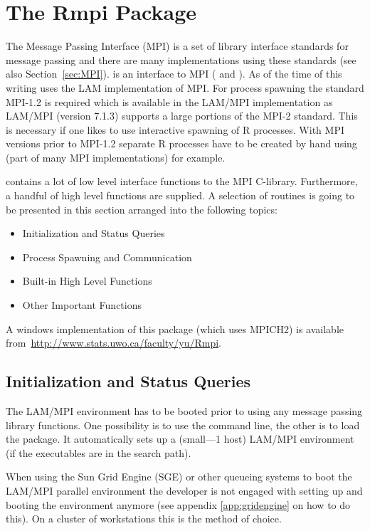 \section{The Rmpi Package}
\label{sec:Rmpi}
The Message Passing Interface (MPI) is a set of library interface
standards for message passing and there are many implementations using
these standards (see also Section~\ref{sec:MPI}).
 is an interface to MPI (\cite{yu02Rmpi} and
\cite{yu06Rmpi}). As 
of the time of this writing  uses
the LAM implementation of MPI. For process spawning the standard
MPI-1.2 is required which is available in the LAM/MPI implementation 
as LAM/MPI (version 7.1.3) supports a large portions of the MPI-2
standard. This is necessary if one likes to use interactive spawning
of R processes. With MPI versions prior to MPI-1.2 separate R
processes have to be created by hand using  (part of many
MPI implementations) for example.

 contains a lot of low level interface functions to the MPI
C-library. 
Furthermore, a handful of high level functions are supplied. A
selection of routines is going to be presented in this section arranged
into the following topics:

\begin{itemize}
\item Initialization and Status Queries
\item Process Spawning and Communication
\item Built-in High Level Functions
\item Other Important Functions
\end{itemize}  

A windows implementation of this package (which uses MPICH2)
is available from~\url{http://www.stats.uwo.ca/faculty/yu/Rmpi}.

\subsection{Initialization and Status Queries}

The LAM/MPI environment has to be booted prior to using any
message passing library functions. One possibility is to use the
command line, the other is to load the  package. It automatically
sets up a (small---1 host) LAM/MPI environment (if the executables are
in the search path). 

When using the Sun Grid Engine (SGE) or other queueing systems to boot
the LAM/MPI parallel environment the developer is not engaged with
setting up and booting the environment anymore (see
appendix \ref{app:gridengine} on how to do this). On a cluster of
workstations this is the method of choice. 


